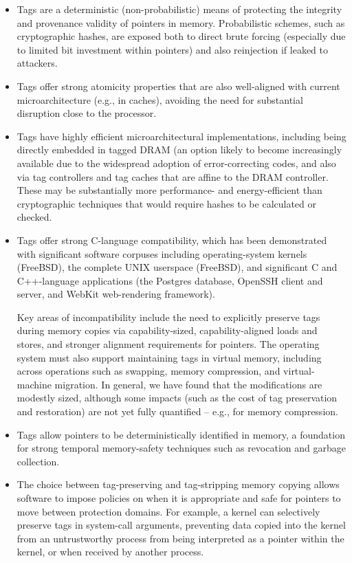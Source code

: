 \begin{itemize}
\item Tags are a deterministic (non-probabilistic) means of protecting the
  integrity and provenance validity of pointers in memory.
  Probabilistic schemes, such as cryptographic hashes, are exposed both to
  direct brute forcing (especially due to limited bit investment within
  pointers) and also reinjection if leaked to attackers.

\item Tags offer strong atomicity properties that are also well-aligned with
  current microarchitecture (e.g., in caches), avoiding the need for
  substantial disruption close to the processor.

\item Tags have highly efficient microarchitectural implementations, including
  being directly embedded in tagged DRAM (an option likely to become increasingly
  available due to the widespread adoption of
error-correcting codes, and also via tag
  controllers and tag caches that are affine to the DRAM controller.
  These may be substantially more performance- and energy-efficient than
  cryptographic techniques that would require hashes to be calculated or checked.

\item Tags offer strong C-language compatibility, which has been demonstrated
  with significant software corpuses including operating-system kernels
  (FreeBSD), the complete UNIX userspace (FreeBSD), and significant C and
  C++-language applications (the Postgres database, OpenSSH client and server,
  and WebKit web-rendering framework).

  Key areas of incompatibility include the need to explicitly preserve tags
  during memory copies via capability-sized, capability-aligned loads and
  stores, and stronger alignment requirements for pointers.
  The operating system must also support maintaining tags in virtual memory,
  including across operations such as swapping, memory compression, and
  virtual-machine migration.
  In general, we have found that the modifications are modestly sized,
  although some impacts (such as the cost of tag preservation and
  restoration) are not yet fully quantified -- e.g., for memory compression.

\item Tags allow pointers to be deterministically identified in memory, a
  foundation for strong temporal memory-safety techniques such as revocation
  and garbage collection.

\item The choice between tag-preserving and tag-stripping memory copying
  allows software to impose policies on when it is appropriate and safe for
  pointers to move between protection domains.
  For example, a kernel can selectively preserve tags in system-call
  arguments,
  preventing data copied into the kernel from an untrustworthy process from
  being interpreted as a pointer within the kernel, or when received by
  another process.
\end{itemize}

